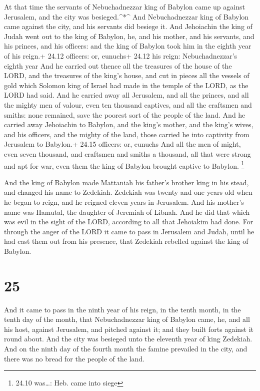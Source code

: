  At that time the servants of Nebuchadnezzar king of
Babylon came up against Jerusalem, and the city was besieged.\^{}*\^{}
 And Nebuchadnezzar king of Babylon came against the city,
and his servants did besiege it.  And Jehoiachin the king
of Judah went out to the king of Babylon, he, and his mother, and his
servants, and his princes, and his officers: and the king of Babylon
took him in the eighth year of his reign.+ 24.12 officers: or, eunuchs+
24.12 his reign: Nebuchadnezzar's eighth year  And he
carried out thence all the treasures of the house of the LORD, and the
treasures of the king's house, and cut in pieces all the vessels of gold
which Solomon king of Israel had made in the temple of the LORD, as the
LORD had said.  And he carried away all Jerusalem, and all
the princes, and all the mighty men of valour, even ten thousand
captives, and all the craftsmen and smiths: none remained, save the
poorest sort of the people of the land.  And he carried
away Jehoiachin to Babylon, and the king's mother, and the king's wives,
and his officers, and the mighty of the land, those carried he into
captivity from Jerusalem to Babylon.+ 24.15 officers: or, eunuchs
 And all the men of might, even seven thousand, and
craftsmen and smiths a thousand, all that were strong and apt for war,
even them the king of Babylon brought captive to Babylon. \footnote{24.10
  was\ldots: Heb. came into siege}

 And the king of Babylon made Mattaniah his father's
brother king in his stead, and changed his name to Zedekiah.
 Zedekiah was twenty and one years old when he began to
reign, and he reigned eleven years in Jerusalem. And his mother's name
was Hamutal, the daughter of Jeremiah of Libnah.  And he
did that which was evil in the sight of the LORD, according to all that
Jehoiakim had done.  For through the anger of the LORD it
came to pass in Jerusalem and Judah, until he had cast them out from his
presence, that Zedekiah rebelled against the king of Babylon.

\hypertarget{section-24}{%
\section{25}\label{section-24}}

 And it came to pass in the ninth year of his reign, in the
tenth month, in the tenth day of the month, that Nebuchadnezzar king of
Babylon came, he, and all his host, against Jerusalem, and pitched
against it; and they built forts against it round about. 
And the city was besieged unto the eleventh year of king Zedekiah.
 And on the ninth day of the fourth month the famine
prevailed in the city, and there was no bread for the people of the
land.

